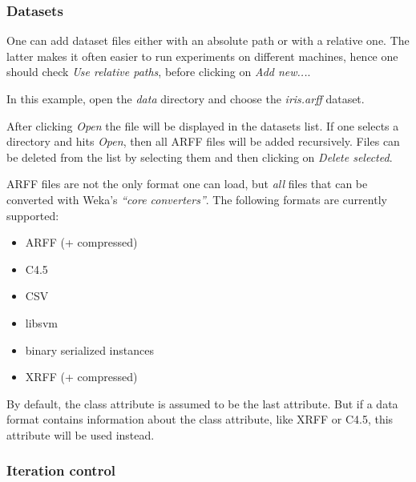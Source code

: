 \subsubsection{Datasets}

One can add dataset files either with an absolute path or with a relative one. The latter makes it often easier to run experiments on different machines, hence one should check \textit{Use relative paths}, before clicking on \textit{Add new...}.

\begin{center}
\end{center}


In this example, open the \textit{data} directory and choose the \textit{iris.arff} dataset.

\begin{center}
\end{center}


After clicking \textit{Open} the file will be displayed in the datasets list. If one selects a directory and hits \textit{Open}, then all ARFF files will be added recursively. Files can be deleted from the list by selecting them and then clicking on \textit{Delete selected}.

ARFF files are not the only format one can load, but \textit{all} files that can be converted with Weka's \textit{``core converters''}. The following formats are currently supported:

\begin{itemize}
	\item ARFF (+ compressed)
	\item C4.5
	\item CSV
	\item libsvm
	\item binary serialized instances
	\item XRFF (+ compressed)
\end{itemize}

By default, the class attribute is assumed to be the last attribute. But if a data format contains information about the class attribute, like XRFF or C4.5, this attribute will be used instead.

\begin{center}
\end{center}


\subsubsection{Iteration control}


